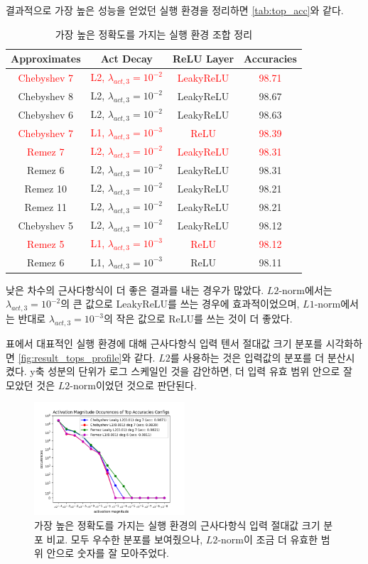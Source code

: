 \documentclass[a4paper, 11pt, chapterprefix=false]{report}
\newcommand{\alert}[1]{\textcolor{red}{#1}}
\begin{document}
결과적으로 가장 높은 성능을 얻었던 실행 환경을 정리하면 \autoref{tab:top_acc}와
같다.
\begin{table}[htbp]
  \center
  \begin{tabular}{|c|c|c|c|} \hline
    Approximates & Act Decay & ReLU Layer & Accuracies \\ \hline
    \alert{Chebyshev 7} & \alert{L2, $\lambda_{act,3}=10^{-2}$} & \alert{LeakyReLU} & \alert{98.71} \\
    Chebyshev 8 & L2, $\lambda_{act,3}=10^{-2}$ & LeakyReLU & 98.67 \\
    Chebyshev 6 & L2, $\lambda_{act,3}=10^{-2}$ & LeakyReLU & 98.63 \\
    \alert{Chebyshev 7} & \alert{L1, $\lambda_{act,3}=10^{-3}$} & \alert{ReLU} & \alert{98.39} \\
    \alert{Remez 7} & \alert{L2, $\lambda_{act,3}=10^{-2}$} & \alert{LeakyReLU} & \alert{98.31} \\
    Remez 6 & L2, $\lambda_{act,3}=10^{-2}$ & LeakyReLU & 98.31 \\
    Remez 10 & L2, $\lambda_{act,3}=10^{-2}$ & LeakyReLU & 98.21 \\
    Remez 11 & L2, $\lambda_{act,3}=10^{-2}$ & LeakyReLU & 98.21 \\
    Chebyshev 5 & L2, $\lambda_{act,3}=10^{-2}$ & LeakyReLU & 98.12 \\
    \alert{Remez 5} & \alert{L1, $\lambda_{act,3}=10^{-3}$} & \alert{ReLU} & \alert{98.12} \\
    Remez 6 & L1, $\lambda_{act,3}=10^{-3}$ & ReLU & 98.11 \\
    \hline
  \end{tabular}
  \caption{가장 높은 정확도를 가지는 실행 환경 조합 정리}
  \label{tab:top_acc}
\end{table}
낮은 차수의 근사다항식이 더 좋은 결과를 내는 경우가 많았다. $L2$-norm에서는
$\lambda_{act,3}=10^{-2}$의 큰 값으로 LeakyReLU를 쓰는 경우에 효과적이었으며,
$L1$-norm에서는 반대로  $\lambda_{act,3}=10^{-3}$의 작은 값으로 ReLU를 쓰는 것이
더 좋았다.

표에서 대표적인 실행 환경에 대해 근사다항식 입력 텐서 절대값 크기 분포를
시각화하면 \autoref{fig:result_tops_profile}와 같다. $L2$를 사용하는 것은
입력값의 분포를 더 분산시켰다. y축 성분의 단위가 로그 스케일인 것을 감안하면, 더
입력 유효 범위 안으로 잘 모았던 것은 $L2$-norm이었던 것으로 판단된다.
\begin{figure}[htbp]
  \centering
  \includegraphics[width=0.5\textwidth]{resource/tops_profile.png}
  \caption{가장 높은 정확도를 가지는 실행 환경의 근사다항식 입력 절대값 크기 분포 비교. 모두 우수한 분포를 보여줬으나, $L2$-norm이 조금 더 유효한 범위 안으로 숫자를 잘 모아주었다.}
  \label{fig:result_tops_profile}
\end{figure}
\end{document}
